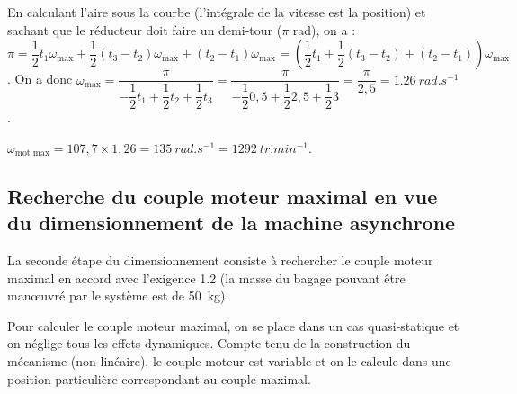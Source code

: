 \fi

\ifprof
\begin{corrige}
En calculant l'aire sous la courbe (l'intégrale de la vitesse est la position) et sachant que le réducteur doit faire un demi-tour ($\pi$ rad), on a : 
$\pi = \dfrac{1}{2}t_1 \omega_{\text{max}} +\dfrac{1}{2}\left( t_3 - t_2\right) \omega_{\text{max}} + \left( t_2 - t_1\right)\omega_{\text{max}}= \left(\dfrac{1}{2}t_1  +\dfrac{1}{2}\left( t_3 - t_2\right)  + \left( t_2 - t_1\right)\right)\omega_{\text{max}} $.  On a donc $\omega_{\text{max}}  = \dfrac{\pi}{ -\dfrac{1}{2}t_1 +\dfrac{1}{2}t_2 +  \dfrac{1}{2}t_3  }=\dfrac{\pi}{ -\dfrac{1}{2}0,5 +\dfrac{1}{2}2,5  +\dfrac{1}{2} 3 }=\dfrac{\pi}{2,5}=\SI{1,26}{rad.s^{-1}}$.
\end{corrige}
\else
\fi



\ifprof
\begin{corrige}
$\omega_{\text{mot max}}=107,7\times 1,26 = \SI{135}{rad.s^{-1}}=\SI{1292}{tr.min^{-1}}$.
\end{corrige}
\else
\fi

\subsection*{Recherche du couple moteur maximal en vue du dimensionnement de la machine asynchrone}

\begin{obj}
La seconde étape du dimensionnement consiste à rechercher le couple moteur maximal en accord avec
l’exigence 1.2 (la masse du bagage pouvant être manœuvré par le système est de \SI{50}{kg}).
\end{obj}


\ifprof
\else


Pour calculer le couple moteur maximal, on se place dans un cas quasi-statique et on néglige tous les effets
dynamiques. Compte tenu de la construction du mécanisme (non linéaire), le couple moteur est variable et on
le calcule dans une position particulière correspondant au couple maximal.

